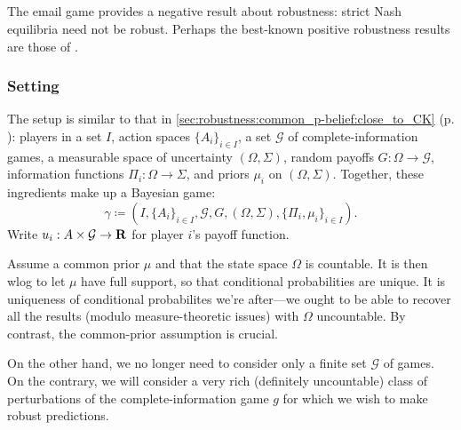 \documentclass[11pt,letterpaper,reqno,oneside]{article}
\begin{document}
\subsection{\texorpdfstring{\textcite{KajiiMorris1997ecta}}{Kajii and Morris (1997)}}
\label{sec:robustness:KajiiMorris}

The email game provides a negative result about robustness: strict Nash equilibria need not be robust. Perhaps the best-known positive robustness results are those of \textcite{KajiiMorris1997ecta}.



\subsubsection{Setting}
\label{sec:robustness:KajiiMorris:setting}

The setup is similar to that in \cref{sec:robustness:common_p-belief:close_to_CK} (p. \pageref{sec:robustness:common_p-belief:close_to_CK}): players in a set $I$, action spaces $\{ A_i \}_{i \in I}$, a set $\mathcal{G}$ of complete-information games, a measurable space of uncertainty $(\Omega,\Sigma)$, random payoffs $G : \Omega \to \mathcal{G}$, information functions $\Pi_i : \Omega \to \Sigma$, and priors $\mu_i$ on $(\Omega,\Sigma)$. Together, these ingredients make up a Bayesian game:
%
\begin{equation*}
	\gamma \coloneqq \left(
	I, \{ A_i \}_{i \in I}, \mathcal{G}, G, (\Omega,\Sigma), \{\Pi_i,\mu_i\}_{i \in I}
	\right) .
\end{equation*}
%
Write $u_i : A \times \mathcal{G} \to \mathbf{R}$ for player $i$'s payoff function.

Assume a common prior $\mu$ and that the state space $\Omega$ is countable. It is then wlog to let $\mu$ have full support, so that conditional probabilities are unique. It is uniqueness of conditional probabilites we're after---we ought to be able to recover all the results (modulo measure-theoretic issues) with $\Omega$ uncountable. By contrast, the common-prior assumption is crucial.

On the other hand, we no longer need to consider only a finite set $\mathcal{G}$ of games. On the contrary, we will consider a very rich (definitely uncountable) class of perturbations of the complete-information game $g$ for which we wish to make robust predictions.
\end{document}
